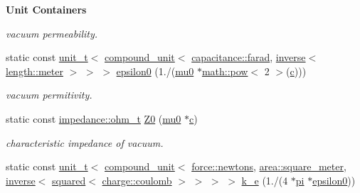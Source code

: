 \begin{Indent}{\bf Unit Containers}
\begin{DoxyCompactItemize}
\begin{DoxyCompactList}\small\item\em vacuum permeability. \end{DoxyCompactList}\item 
\hypertarget{namespaceunits_1_1constants_abc060bee86b13f4eca38c91b66a739d3}{}static const \hyperlink{classunits_1_1unit__t}{unit\+\_\+t}$<$ \hyperlink{group___unit_types_ga9c3f6f077dc894620e1ed8358442a8f1}{compound\+\_\+unit}$<$ \hyperlink{structunits_1_1unit}{capacitance\+::farad}, \hyperlink{group___unit_manipulators_gaacc539ef162e24b260d023d3ff949b57}{inverse}$<$ \hyperlink{structunits_1_1unit}{length\+::meter} $>$ $>$ $>$ \hyperlink{namespaceunits_1_1constants_abc060bee86b13f4eca38c91b66a739d3}{epsilon0} (1./(\hyperlink{namespaceunits_1_1constants_a65b9f097ea8f09448637adf41488b1d9}{mu0} $\ast$\hyperlink{namespaceunits_1_1math_adf689b7864a5c78a00628574cc8dca6b}{math\+::pow}$<$ 2 $>$(\hyperlink{namespaceunits_1_1constants_af2f6ceb36b94d17be484ab030a88073e}{c})))\label{namespaceunits_1_1constants_abc060bee86b13f4eca38c91b66a739d3}

\begin{DoxyCompactList}\small\item\em vacuum permitivity. \end{DoxyCompactList}\item 
\hypertarget{namespaceunits_1_1constants_a88f7a63095845aa01681f207047d6432}{}static const \hyperlink{classunits_1_1unit__t}{impedance\+::ohm\+\_\+t} \hyperlink{namespaceunits_1_1constants_a88f7a63095845aa01681f207047d6432}{Z0} (\hyperlink{namespaceunits_1_1constants_a65b9f097ea8f09448637adf41488b1d9}{mu0} $\ast$\hyperlink{namespaceunits_1_1constants_af2f6ceb36b94d17be484ab030a88073e}{c})\label{namespaceunits_1_1constants_a88f7a63095845aa01681f207047d6432}

\begin{DoxyCompactList}\small\item\em characteristic impedance of vacuum. \end{DoxyCompactList}\item 
\hypertarget{namespaceunits_1_1constants_ac85d73f710764c486ac3bed3f6606b64}{}static const \hyperlink{classunits_1_1unit__t}{unit\+\_\+t}$<$ \hyperlink{group___unit_types_ga9c3f6f077dc894620e1ed8358442a8f1}{compound\+\_\+unit}$<$ \hyperlink{structunits_1_1unit}{force\+::newtons}, \hyperlink{structunits_1_1unit}{area\+::square\+\_\+meter}, \hyperlink{group___unit_manipulators_gaacc539ef162e24b260d023d3ff949b57}{inverse}$<$ \hyperlink{group___unit_manipulators_ga636346f7898c35eb98a796bec1d77fb2}{squared}$<$ \hyperlink{structunits_1_1unit}{charge\+::coulomb} $>$ $>$ $>$ $>$ \hyperlink{namespaceunits_1_1constants_ac85d73f710764c486ac3bed3f6606b64}{k\+\_\+e} (1./(4 $\ast$\hyperlink{namespaceunits_1_1constants_a2a49f99b6adbb852fb62b5584c902f78}{pi} $\ast$\hyperlink{namespaceunits_1_1constants_abc060bee86b13f4eca38c91b66a739d3}{epsilon0}))\label{namespaceunits_1_1constants_ac85d73f710764c486ac3bed3f6606b64}


\end{DoxyCompactItemize}
\end{Indent}
